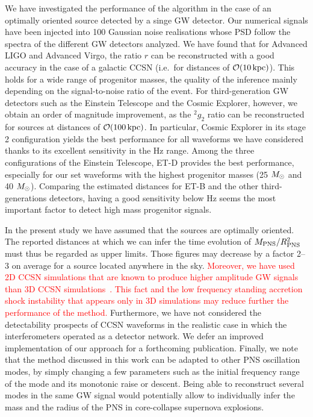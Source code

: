 We have investigated the performance of the algorithm in the case of an optimally oriented source detected by a singe GW detector. Our numerical signals have been injected into 100 Gaussian noise realisations whose PSD follow the spectra of the different GW detectors analyzed. We have found that for Advanced LIGO and Advanced Virgo, the ratio $r$ can be reconstructed with a good accuracy in the case of a galactic CCSN (i.e.~for distances of ${\cal O}(10\, {\rm kpc})$). This holds for a wide range of progenitor masses, the quality of the inference mainly depending on the signal-to-noise ratio of the event. For third-generation GW detectors such as the Einstein Telescope and the Cosmic Explorer, however, we obtain an order of magnitude improvement, as the $\mbox{}^2g_2$ ratio can be reconstructed for sources at distances of ${\cal O}(\unit[100]{kpc})$. In particular, Cosmic Explorer in its stage 2 configuration yields the best performance for all waveforms we have considered thanks to its excellent sensitivity in the \unit[100-1000]{Hz} range. Among the three configurations of the Einstein Telescope, ET-D provides the best performance, especially for our set waveforms with the highest progenitor masses (25 $M_{\odot}$ and 40 $M_{\odot}$). Comparing the estimated distances for ET-B and the other third-generations detectors, having a good sensitivity below \unit[200]{Hz} seems the most important factor to detect high mass progenitor signals.

In the present study we have assumed that the sources are optimally oriented. The reported distances at which
we can infer the time evolution of $M_{\rm PNS}/R_{\rm PNS}^2$ must thus be regarded as upper limits. Those figures may decrease by a factor 2--3 on average for a source located anywhere in the sky.
\textcolor{red}{Moreover, we have used 2D CCSN simulations that are known to produce higher amplitude GW signals than 3D CCSN simulations~\citep{Radice:2018usf, Mezzacappa:2020lsn}. This fact and the low frequency standing accretion shock instability that appears only in 3D simulations may reduce further the performance of the method.}
Furthermore, we have not considered the detectability prospects of  CCSN waveforms in the realistic case in which the  interferometers operated as a detector network. 
We defer an improved implementation of our approach for a forthcoming publication. Finally, we note that the method discussed in this work can be adapted to other PNS oscillation modes, by simply changing a few parameters such as the initial frequency range of the mode and its monotonic raise or descent. Being able to reconstruct several modes in the same GW signal would potentially allow to individually infer the mass and the radius of the PNS in core-collapse supernova explosions.


